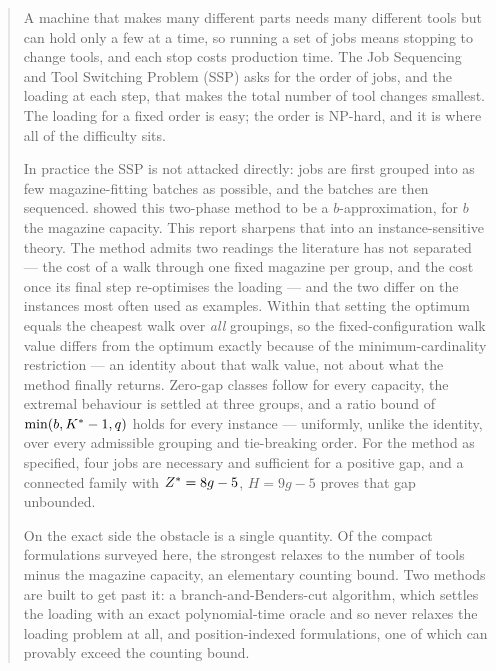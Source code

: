 \begin{abstract}
\noindent
A machine that makes many different parts needs many different tools but can hold only a
few at a time, so running a set of jobs means stopping to change tools, and each stop
costs production time. The Job Sequencing and Tool Switching Problem (SSP) asks for the
order of jobs, and the loading at each step, that makes the total number of tool changes
smallest. The loading for a fixed order is easy; the order is NP-hard, and it is where
all of the difficulty sits.

In practice the SSP is not attacked directly: jobs are first grouped into as few
magazine-fitting batches as possible, and the batches are then sequenced.
\citet{CramaKlundert1999} showed this two-phase method to be a $b$-approximation, for
$b$ the magazine capacity. This report sharpens that into an instance-sensitive theory.
The method admits two readings the literature has not separated --- the cost of a walk
through one fixed magazine per group, and the cost once its final step re-optimises the
loading --- and the two differ on the instances most often used as examples. Within that
setting the optimum equals the cheapest walk over \emph{all} groupings, so the
fixed-configuration walk value differs from the optimum exactly because of the
minimum-cardinality restriction --- an identity about that walk value, not about what
the method finally returns. Zero-gap classes follow for every
capacity, the extremal behaviour is settled at three groups, and a ratio bound of
$\min(b,\Kst-1,q)$ holds for every instance --- uniformly, unlike the identity, over
every admissible grouping and tie-breaking order. For the method as specified, four jobs
are necessary and sufficient for a positive gap, and a connected family with
$\Zst=8g-5$, $H=9g-5$ proves that gap unbounded.

On the exact side the obstacle is a single quantity. Of the compact formulations
surveyed here, the strongest relaxes to the number of tools minus the magazine capacity,
an elementary counting bound. Two methods are built to get past it: a
branch-and-Benders-cut algorithm, which settles the loading with an exact
polynomial-time oracle and so never relaxes the loading problem at all, and
position-indexed formulations, one of which can provably exceed the counting bound.


\end{abstract}
